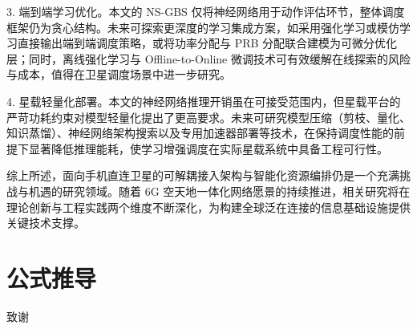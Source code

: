 \documentclass[type=master]{fduthesis}
\begin{document}
3. 端到端学习优化。本文的 NS-GBS 仅将神经网络用于动作评估环节，整体调度框架仍为贪心结构。未来可探索更深度的学习集成方案，如采用强化学习或模仿学习直接输出端到端调度策略，或将功率分配与 PRB 分配联合建模为可微分优化层；同时，离线强化学习与 Offline-to-Online 微调技术可有效缓解在线探索的风险与成本，值得在卫星调度场景中进一步研究。

4. 星载轻量化部署。本文的神经网络推理开销虽在可接受范围内，但星载平台的严苛功耗约束对模型轻量化提出了更高要求。未来可研究模型压缩（剪枝、量化、知识蒸馏）、神经网络架构搜索以及专用加速器部署等技术，在保持调度性能的前提下显著降低推理能耗，使学习增强调度在实际星载系统中具备工程可行性。

综上所述，面向手机直连卫星的可解耦接入架构与智能化资源编排仍是一个充满挑战与机遇的研究领域。随着 6G 空天地一体化网络愿景的持续推进，相关研究将在理论创新与工程实践两个维度不断深化，为构建全球泛在连接的信息基础设施提供关键技术支撑。

\appendix

\chapter{公式推导}

\backmatter

\printbibliography

\begin{acknowledgements}
  致谢
\end{acknowledgements}
\end{document}
